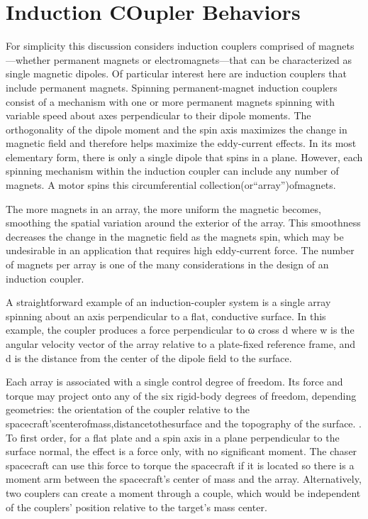 \section{Induction COupler Behaviors}

For simplicity this discussion considers induction couplers comprised of magnets—whether permanent magnets or electromagnets—that can be characterized as single magnetic dipoles. Of particular interest here are induction couplers that include permanent magnets. Spinning permanent-magnet induction couplers consist of a mechanism with one or more permanent magnets spinning with variable speed about axes perpendicular to their dipole moments. The orthogonality of the dipole moment and the spin axis maximizes the change in magnetic field and therefore helps maximize the eddy-current effects. In its most elementary form, there is only a single dipole that spins in a plane. However, each spinning mechanism within the induction coupler can include any number of magnets. A motor spins this circumferential collection‎(or‎“array”)‎of‎magnets.

The more magnets in an array, the more uniform the magnetic becomes, smoothing the spatial variation around the exterior of the array. This smoothness decreases the change in the magnetic field as the magnets spin, which may be undesirable in an application that requires high eddy-current force. The number of magnets per array is one of the many considerations in the design of an induction coupler.

A straightforward example of an induction-coupler system is a single array spinning about an axis perpendicular to a flat, conductive surface. In this example, the coupler produces a force perpendicular to ω cross d where w is the angular velocity vector of the array relative to a plate-fixed reference frame, and d is the distance from the center of the dipole field to the surface.

Each array is associated with a single control degree of freedom. Its force and torque may project onto any of the six rigid-body degrees of freedom, depending geometries: the orientation of the coupler relative to the spacecraft’s‎center‎of‎mass,‎distance‎to‎the‎surface and the topography of the surface. . To first order, for a flat plate and a spin axis in a plane perpendicular to the surface normal, the effect is a force only, with no significant moment. The chaser spacecraft can use this force to torque the spacecraft if it is located so there is a moment arm between the spacecraft's center of mass and the array. Alternatively, two couplers can create a moment through a couple, which would be independent of‎ the‎ couplers’‎ position‎ relative‎ to‎ the‎ target’s‎ mass‎ center.

